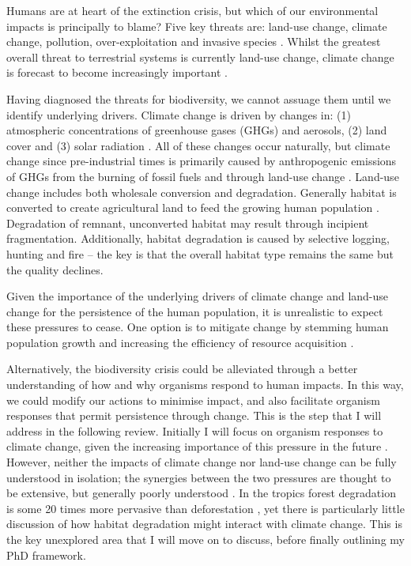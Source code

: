 \documentclass[12pt,a4paper,]{report}
\theoremstyle{definition}
\theoremstyle{definition}
\theoremstyle{definition}
\theoremstyle{remark}
\begin{document}
Humans are at heart of the extinction crisis, but which of our
environmental impacts is principally to blame? Five key threats are:
land-use change, climate change, pollution, over-exploitation and
invasive species \citep{hirsch_global2010}. Whilst the greatest overall
threat to terrestrial systems is currently land-use change, climate
change is forecast to become increasingly important
\citep{sala_global2000}.

Having diagnosed the threats for biodiversity, we cannot assuage them
until we identify underlying drivers. Climate change is driven by
changes in: (1) atmospheric concentrations of greenhouse gases (GHGs)
and aerosols, (2) land cover and (3) solar radiation \citep{ipcc2013}.
All of these changes occur naturally, but climate change since
pre-industrial times is primarily caused by anthropogenic emissions of
GHGs from the burning of fossil fuels and through land-use change
\citep{ipcc2013}. Land-use change includes both wholesale conversion and
degradation. Generally habitat is converted to create agricultural land
to feed the growing human population
\citep{foley_solutions2011, godfray_food2010}. Degradation of remnant,
unconverted habitat may result through incipient fragmentation.
Additionally, habitat degradation is caused by selective logging,
hunting and fire -- the key is that the overall habitat type remains the
same but the quality declines.

Given the importance of the underlying drivers of climate change and
land-use change for the persistence of the human population, it is
unrealistic to expect these pressures to cease. One option is to
mitigate change by stemming human population growth and increasing the
efficiency of resource acquisition \citep{godfray_food2010}.

Alternatively, the biodiversity crisis could be alleviated through a
better understanding of how and why organisms respond to human impacts.
In this way, we could modify our actions to minimise impact, and also
facilitate organism responses that permit persistence through change.
This is the step that I will address in the following review. Initially
I will focus on organism responses to climate change, given the
increasing importance of this pressure in the future
\citep{sala_global2000}. However, neither the impacts of climate change
nor land-use change can be fully understood in isolation; the synergies
between the two pressures are thought to be extensive, but generally
poorly understood
\citep{brodie_climate2012, mantyka-pringle_interactions2012}. In the
tropics forest degradation is some 20 times more pervasive than
deforestation \citep{asner_contemporary2009}, yet there is particularly
little discussion of how habitat degradation might interact with climate
change. This is the key unexplored area that I will move on to discuss,
before finally outlining my PhD framework.
\end{document}
